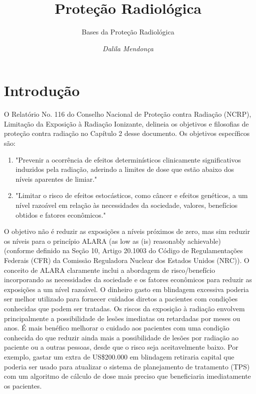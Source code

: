 \documentclass[11pt,a4paper]{article}
\title{\LobsterTwo\Huge{Proteção Radiológica}}
\author{\LobsterTwo\Large{Bases da Proteção Radiológica}\nocite{*}}
\date{\LobsterTwo\textit{Dalila Mendonça}}
\newcounter{exemplo}
\begin{document}
	\maketitle

\section{Introdução}

	O Relatório No. 116 do Conselho Nacional de Proteção contra Radiação (NCRP), Limitação da Exposição à Radiação Ionizante, delineia os objetivos e filosofias de proteção contra radiação no Capítulo 2 desse documento. Os objetivos específicos são:

	\begin{enumerate}[label=\textcolor{CarnationPink}{\arabic*${}^\circ$}]
		\item "Prevenir a ocorrência de efeitos determinísticos clinicamente significativos induzidos pela radiação, aderindo a limites de dose que estão abaixo dos níveis aparentes de limiar."
		\item "Limitar o risco de efeitos estocásticos, como câncer e efeitos genéticos, a um nível razoável em relação às necessidades da sociedade, valores, benefícios obtidos e fatores econômicos."
	\end{enumerate}

	O objetivo não é reduzir as exposições a níveis próximos de zero, mas sim reduzir os níveis para o princípio ALARA (as low as (is) reasonably achievable) (conforme definido na Seção 10, Artigo 20.1003 do Código de Regulamentações Federais (CFR) da Comissão Reguladora Nuclear dos Estados Unidos (NRC)). O conceito de ALARA claramente inclui a abordagem de risco/benefício incorporando as necessidades da sociedade e os fatores econômicos para reduzir as exposições a um nível razoável. O dinheiro gasto em blindagem excessiva poderia ser melhor utilizado para fornecer cuidados diretos a pacientes com condições conhecidas que podem ser tratadas. Os riscos da exposição à radiação envolvem principalmente a possibilidade de lesões imediatas ou retardadas por meses ou anos. É mais benéfico melhorar o cuidado aos pacientes com uma condição conhecida do que reduzir ainda mais a possibilidade de lesões por radiação ao paciente ou a outras pessoas, desde que o risco seja aceitavelmente baixo. Por exemplo, gastar um extra de US\$200.000 em blindagem retiraria capital que poderia ser usado para atualizar o sistema de planejamento de tratamento (TPS) com um algoritmo de cálculo de dose mais preciso que beneficiaria imediatamente os pacientes.
\end{document}
